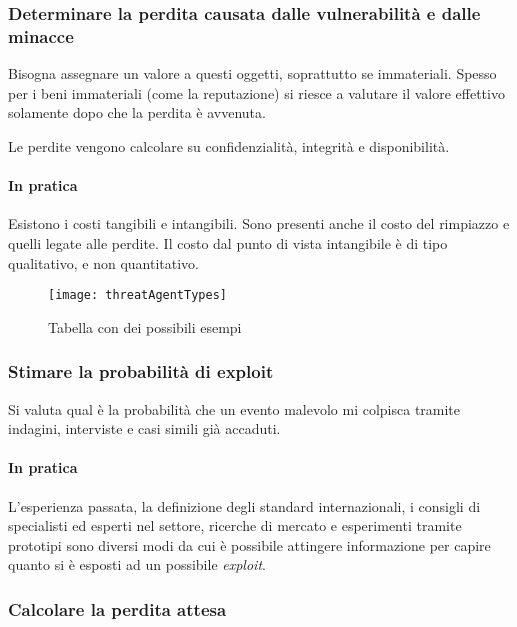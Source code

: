 \subsubsection{Determinare la perdita causata dalle vulnerabilità e dalle
minacce}

Bisogna assegnare un valore a questi oggetti, soprattutto se immateriali. 
Spesso per i beni immateriali (come la reputazione) si riesce a valutare il 
valore effettivo solamente dopo che la perdita è avvenuta.

Le perdite vengono calcolare su confidenzialità, integrità e disponibilità.

\paragraph*{In pratica}

Esistono i costi tangibili e intangibili. Sono presenti anche il costo del
rimpiazzo e quelli legate alle perdite.
Il costo dal punto di vista intangibile è di tipo qualitativo, e non
quantitativo.

\begin{figure}[H]
 \centering
 \texttt{[image: threatAgentTypes]}
 \caption{Tabella con dei possibili esempi}
\end{figure}


\subsubsection{Stimare la probabilità di exploit}

Si valuta qual è la probabilità che un evento malevolo mi colpisca tramite
indagini, interviste e casi simili già accaduti.

\paragraph*{In pratica}

L'esperienza passata, la definizione degli standard internazionali, i consigli
di specialisti ed esperti nel settore, ricerche di mercato e esperimenti
tramite prototipi sono diversi modi da cui è possibile attingere
informazione per capire quanto si è esposti ad un possibile \textit{exploit}.



\subsubsection{Calcolare la perdita attesa}

